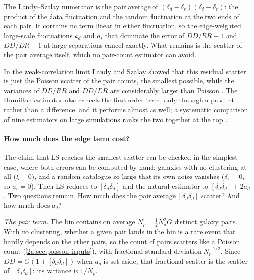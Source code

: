 \begin{keyidea}
The Landy--Szalay numerator is the pair average of
$(\delta_d-\delta_r)(\delta_d-\delta_r)$: the product of the data fluctuation and
the random fluctuation at the two ends of each pair. It contains no term linear
in either fluctuation, so the edge-weighted large-scale fluctuations $a_d$ and
$a_r$ that dominate the error of $DD/RR-1$ and $DD/DR-1$ at large separations
cancel exactly. What remains is the scatter of the pair average itself, which no
pair-count estimator can avoid.
\end{keyidea}

In the weak-correlation limit Landy and Szalay showed that this residual scatter
is just the Poisson scatter of the pair counts, the smallest possible, while the
variances of $DD/RR$ and $DD/DR$ are considerably larger than Poisson
. The Hamilton estimator also cancels the
first-order term, only through a product rather than a difference, and it
performs almost as well; a systematic comparison of nine estimators on large
simulations ranks the two together at the top \cite{Kerscher2000}
.

\paragraph{How much does the edge term cost?}
The claim that LS reaches the smallest scatter can be checked in the simplest
case, where both errors can be computed by hand: galaxies with no clustering at
all ($\xi=0$), and a random catalogue so large that its own noise vanishes
($\delta_r=0$, so $a_r=0$). Then LS reduces to $[\delta_d\delta_d]$ and the
natural estimator to $[\delta_d\delta_d]+2a_d$. Two questions remain. How much
does the pair average $[\delta_d\delta_d]$ scatter? And how much does $a_d$?

\emph{The pair term.} The bin contains on average
$N_p=\tfrac12N_d^2G$ distinct galaxy pairs. With no clustering, whether a given
pair lands in the bin is a rare event that hardly depends on the other pairs, so
the count of pairs scatters like a Poisson count (\cref{2a:sec:poisson-inputs}),
with fractional standard deviation $N_p^{-1/2}$. Since
$DD=G(1+[\delta_d\delta_d])$ when $a_d$ is set aside, that fractional scatter is
the scatter of $[\delta_d\delta_d]$: its variance is $1/N_p$.

